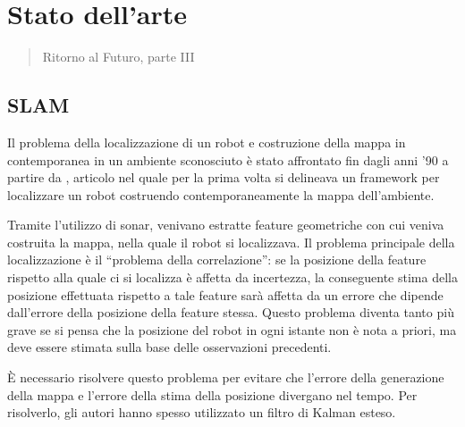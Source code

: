 \chapter{Stato dell'arte}
\label{cap:statoArte}
\thispagestyle{empty}

\begin{quotation}
{\footnotesize
{}
\begin{flushright}
Ritorno al Futuro, parte III
\end{flushright}
}
\end{quotation}
\vspace{0.5cm}

\section{SLAM}

Il problema della localizzazione di un robot e costruzione della mappa in contemporanea in un ambiente sconosciuto è stato affrontato fin dagli anni '90 a partire da \cite{174711}, articolo nel quale per la prima volta si delineava un framework per localizzare un robot costruendo contemporaneamente la mappa dell'ambiente.

Tramite l'utilizzo di sonar, venivano estratte feature geometriche con cui veniva costruita la mappa, nella quale il robot si localizzava. 
Il problema principale della localizzazione è il ``problema della correlazione'': se la posizione della feature rispetto alla quale ci si localizza è affetta da incertezza, la conseguente stima della posizione effettuata rispetto a tale feature sarà affetta da un errore che dipende dall'errore della posizione della feature stessa. 
Questo problema diventa tanto più grave se si pensa che la posizione del robot in ogni istante non è nota a priori, ma deve essere stimata sulla base delle osservazioni precedenti. 

\`E necessario risolvere questo problema per evitare che l'errore della generazione della mappa e l'errore della stima della posizione divergano nel tempo. 
Per risolverlo, gli autori hanno spesso utilizzato un filtro di Kalman esteso.

